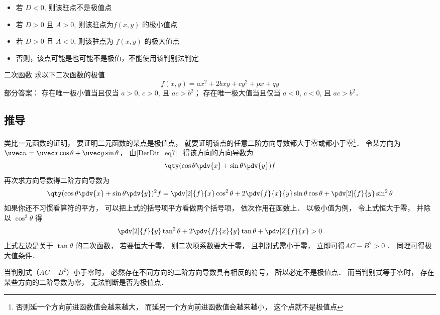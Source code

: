 \begin{itemize}
\item 若 $D<0$, 则该驻点不是极值点
\item 若 $D>0$ 且 $A>0$, 则该驻点为$f(x,y)$ 的极小值点
\item 若 $D>0$ 且 $A<0$, 则该驻点为 $f(x,y)$ 的极大值点
\item 否则，该点可能是也可能不是极值，不能使用该判别法判定
\end{itemize}

\begin{exercise}{二次函数}
求以下二次函数的极值
\begin{equation}
f(x, y) = ax^2 + 2bxy + cy^2 + px + qy
\end{equation}
部分答案： 存在唯一极小值当且仅当 $a>0$, $c>0$, 且 $ac>b^2$； 存在唯一极大值当且仅当 $a<0$, $c<0$, 且 $ac>b^2$．
\end{exercise}

\subsection{推导}

类比一元函数的证明， 要证明二元函数的某点是极值点， 就要证明该点的任意二阶方向导数都大于零或都小于零\footnote{否则延一个方向前进函数值会越来越大， 而延另一个方向前进函数值会越来越小， 这个点就不是极值点}． 令某方向为 $\uvec n = \uvec x \cos\theta + \uvec y \sin\theta$， 由\autoref{DerDir_eq7}~ 得该方向的方向导数为
\begin{equation}
\qty(\cos\theta\pdv{x} + \sin\theta\pdv{y}) f
\end{equation}
再次求方向导数得二阶方向导数为
\begin{equation}
\qty(\cos\theta\pdv{x} + \sin\theta\pdv{y})^2 f
= \pdv[2]{f}{x} \cos^2\theta + 2\pdv{f}{x}{y} \sin\theta\cos\theta + \pdv[2]{f}{y} \sin^2\theta
\end{equation}
如果你还不习惯看算符的平方， 可以把上式的括号项平方看做两个括号项， 依次作用在函数上． 以极小值为例， 令上式恒大于零， 并除以 $\cos^2\theta$ 得
\begin{equation}
\pdv[2]{f}{y} \tan^2\theta + 2\pdv{f}{x}{y} \tan\theta + \pdv[2]{f}{x} > 0
\end{equation}
上式左边是关于 $\tan\theta$ 的二次函数， 若要恒大于零， 则二次项系数要大于零， 且判别式需小于零， 立即可得$AC-B^2>0$ ． 同理可得极大值条件．

当判别式（$AC-B^2$）小于零时， 必然存在不同方向的二阶方向导数具有相反的符号， 所以必定不是极值点． 而当判别式等于零时， 存在某些方向的二阶导数为零， 无法判断是否为极值点．

